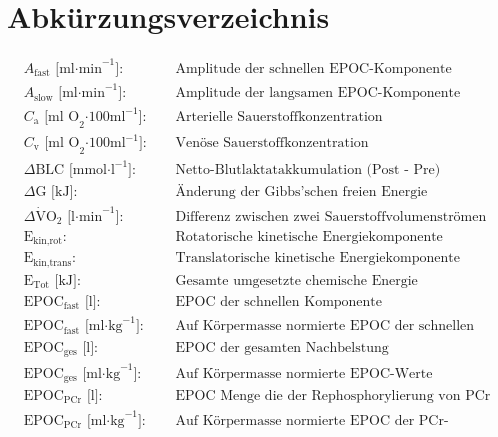 \documentclass[
  letterpaper,
  DIV=11]{scrartcl}
\author{}
\date{}
\begin{document}
\section*{Abkürzungsverzeichnis}\label{abkuxfcrzungsverzeichnis}

\[
\begin{alignat*}{2}
&A_{\text{fast}} \text{ [ml·min}^{-1}\text{]}:&& \text{ Amplitude der schnellen EPOC-Komponente} \\[1ex]
&A_{\text{slow}} \text{ [ml·min}^{-1}\text{]}:&& \text{ Amplitude der langsamen EPOC-Komponente} \\[1ex]
&C_{\text{a}} \text{ [ml O}_2\text{·100ml}^{-1}\text{]}:&& \text{ Arterielle Sauerstoffkonzentration} \\[1ex]
&C_{\text{v}} \text{ [ml O}_2\text{·100ml}^{-1}\text{]}:&& \text{ Venöse Sauerstoffkonzentration} \\[1ex]
&\Delta\text{BLC} \text{ [mmol·l}^{-1}\text{]}: && \text{ Netto-Blutlaktatakkumulation (Post - Pre)} \\[1ex]
&\Delta\text{G} \text{ [kJ]}: && \text{ Änderung der Gibbs'schen freien Energie} \\[1ex]
&\Delta\dot{\text{V}}\text{O}_{2} \text{ [l·min}^{-1}\text{]}: && \text{ Differenz zwischen zwei Sauerstoffvolumenströmen bzw. die Amplitude des Sauerstoffvolumenstroms} \\[1ex]
&\text{E}_{\text{kin,rot}}: && \text{ Rotatorische kinetische Energiekomponente} \\[1ex] 
&\text{E}_{\text{kin,trans}}: && \text{ Translatorische kinetische Energiekomponente} \\[1ex]
&\text{E}_{\text{Tot}} \text{ [kJ]}: && \text{ Gesamte umgesetzte chemische Energie} \\[1ex]
&\text{EPOC}_{\text{fast}} \text{ [l]}:&& \text{ EPOC der schnellen Komponente} \\[1ex]
&\text{EPOC}_{\text{fast}} \text{ [ml·kg}^{-1}\text{]}: && \text{ Auf Körpermasse normierte EPOC der schnellen EPOC} \\[1ex]
&\text{EPOC}_{\text{ges}} \text{ [l]}:&& \text{ EPOC der gesamten Nachbelstung} \\[1ex]
&\text{EPOC}_{\text{ges}} \text{ [ml·kg}^{-1}\text{]}:&& \text{ Auf Körpermasse normierte EPOC-Werte} \\[1ex]
&\text{EPOC}_{\text{PCr}} \text{ [l]}:&& \text{ EPOC Menge die der Rephosphorylierung von PCr zugeordnet wird} \\[1ex]
&\text{EPOC}_{\text{PCr}} \text{ [ml·kg}^{-1}\text{]}: && \text{ Auf Körpermasse normierte EPOC der PCr-Rephosphorylierung} \\[1ex]

\end{alignat*}\]
\end{document}
